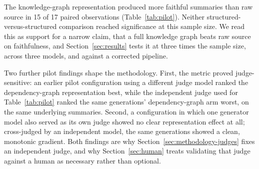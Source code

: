 \documentclass[conference]{IEEEtran}
\begin{document}
The knowledge-graph representation produced more faithful summaries than raw source in 15 of 17
paired observations (Table~\ref{tab:pilot}). Neither structured-versus-structured comparison
reached significance at this sample size. We read this as support for a narrow claim, that a
full knowledge graph beats raw source on faithfulness, and Section~\ref{sec:results} tests it at
three times the sample size, across three models, and against a corrected pipeline.

Two further pilot findings shape the methodology. First, the metric proved judge-sensitive: an
earlier pilot configuration using a different judge model ranked the dependency-graph
representation best, while the independent judge used for Table~\ref{tab:pilot} ranked the same
generations' dependency-graph arm worst, on the same underlying summaries. Second, a
configuration in which one generator model also served as its own judge showed no clear
representation effect at all; cross-judged by an independent model, the same generations showed
a clean, monotonic gradient. Both findings are why Section~\ref{sec:methodology-judges} fixes an
independent judge, and why Section~\ref{sec:human} treats validating that judge against a human
as necessary rather than optional.
\end{document}
